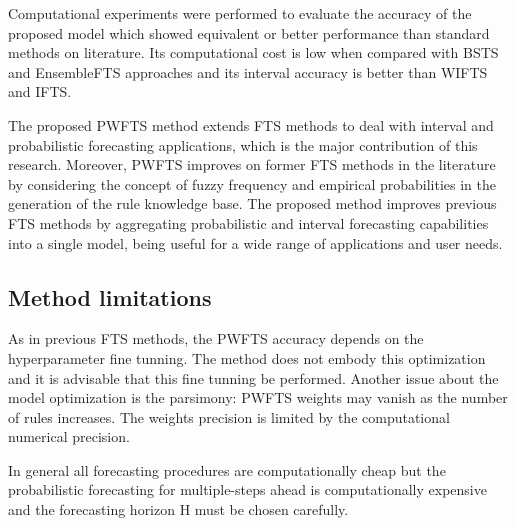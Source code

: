 Computational experiments were performed to evaluate the accuracy of the proposed model which showed equivalent or better performance than standard methods on literature. Its computational cost is low when compared with BSTS and EnsembleFTS approaches and its interval accuracy is better than WIFTS and IFTS.

The proposed PWFTS method extends FTS methods to deal with interval and probabilistic forecasting applications, which is the major contribution of this research. Moreover, PWFTS improves on former FTS methods in the literature by considering the concept of fuzzy frequency and empirical probabilities in the generation of the rule knowledge base. The proposed method improves previous FTS methods by aggregating probabilistic and interval forecasting capabilities into a single model, being useful for a wide range of applications and user needs.

\subsection{Method limitations}

As in previous FTS methods, the PWFTS accuracy depends on the hyperparameter fine tunning. The method does not embody this optimization and it is advisable that this fine tunning be performed. Another issue about the model optimization is the parsimony: PWFTS weights may vanish as the number of rules increases. The weights precision is limited by the computational numerical precision. 

In general all forecasting procedures are computationally cheap but the probabilistic forecasting for multiple-steps ahead is computationally expensive and the forecasting horizon H must be chosen carefully.
